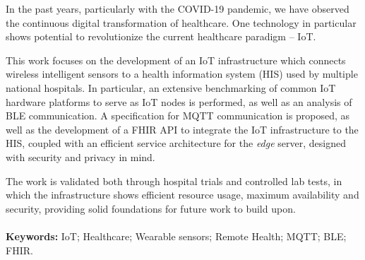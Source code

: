 
\vspace{1cm}
\noindent

In the past years, particularly with the COVID-19 pandemic, we have observed the continuous digital transformation of healthcare. One technology in particular shows potential to revolutionize the current healthcare paradigm -- \acf{IoT}.

This work focuses on the development of an \acs{IoT} infrastructure which connects wireless intelligent sensors to a health information system (\acs{HIS}) used by multiple national hospitals. In particular, an extensive benchmarking of common \acs{IoT} hardware platforms to serve as \acs{IoT} nodes is performed, as well as an analysis of \acf{BLE} communication. A specification for \acf{MQTT} communication is proposed, as well as the development of a \acf{FHIR} \acf{API} to integrate the \acs{IoT} infrastructure to the \acs{HIS}, coupled with an efficient service architecture for the \textit{edge} server, designed with security and privacy in mind.

The work is validated both through hospital trials and controlled lab tests, in which the infrastructure shows efficient resource usage, maximum availability and security, providing solid foundations for future work to build upon.

\paragraph{}\textbf{Keywords:} IoT; Healthcare; Wearable sensors; Remote Health; MQTT; BLE; FHIR.